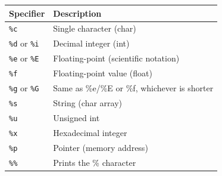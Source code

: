 \documentclass[a4paper, 10pt]{article}
\begin{document}
\begin{center}
    \begin{tabular}{|l|l|}
        \hline
        Specifier                    & Description                                  \\
        \hline
        \texttt{\%c}                 & Single character (char)                      \\
        \hline
        \texttt{\%d} or \texttt{\%i} & Decimal integer (int)                        \\
        \hline
        \texttt{\%e} or \texttt{\%E} & Floating-point (scientific notation)         \\
        \hline
        \texttt{\%f}                 & Floating-point value (float)                 \\
        \hline
        \texttt{\%g} or \texttt{\%G} & Same as \%e/\%E or \%f, whichever is shorter \\
        \hline
        \texttt{\%s}                 & String (char array)                          \\
        \hline
        \texttt{\%u}                 & Unsigned int                                 \\
        \hline
        \texttt{\%x}                 & Hexadecimal integer                          \\
        \hline
        \texttt{\%p}                 & Pointer (memory address)                     \\
        \hline
        \texttt{\%\%}                & Prints the \% character                      \\
        \hline
    \end{tabular}
\end{center}
\end{document}
